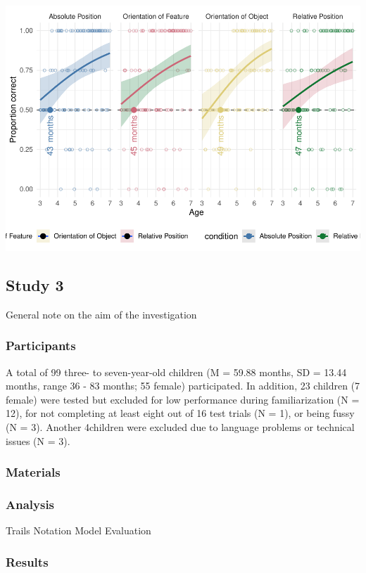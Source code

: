 \documentclass[
  man]{apa6}
\begin{document}
\includegraphics{symlit_rep_manuscript_files/figure-latex/S2_mixbayes_plot-1.pdf}

\subsection{Study 3}\label{study-3}

General note on the aim of the investigation

\subsubsection{Participants}\label{participants-2}

A total of 99 three- to seven-year-old children (M = 59.88 months, SD = 13.44 months, range 36 - 83 months; 55 female) participated. In addition, 23 children (7 female) were tested but excluded for low performance during familiarization (N = 12), for not completing at least eight out of 16 test trials (N = 1), or being fussy (N = 3). Another 4children were excluded due to language problems or technical issues (N = 3).

\subsubsection{Materials}\label{materials-1}

\subsubsection{Analysis}\label{analysis}

Trails
Notation
Model Evaluation

\subsubsection{Results}\label{results-2}
\end{document}
